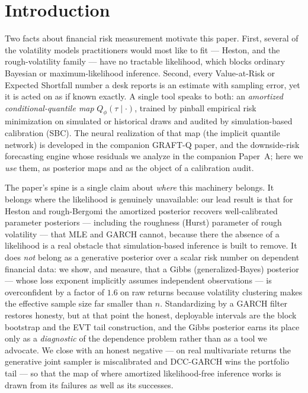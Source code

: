 \documentclass[11pt]{article}
\theoremstyle{remark}
\begin{document}
\section{Introduction}\label{sec:intro}
Two facts about financial risk measurement motivate this paper. First,
several of the volatility models practitioners would most like to fit ---
Heston, and the rough-volatility family --- have no tractable likelihood,
which blocks ordinary Bayesian or maximum-likelihood inference. Second,
every Value-at-Risk or Expected Shortfall number a desk reports is an
estimate with sampling error, yet it is acted on as if known exactly. A
single tool speaks to both: an \emph{amortized conditional-quantile map}
$Q_\phi(\tau\mid\cdot)$, trained by pinball empirical risk minimization
on simulated or historical draws and audited by simulation-based
calibration (SBC). The neural realization of that map (the implicit
quantile network) is developed in the companion GRAFT-Q paper, and the
downside-risk forecasting engine whose residuals we analyze in the
companion Paper~A; here we \emph{use} them, as posterior maps and as the
object of a calibration audit.

The paper's spine is a single claim about \emph{where} this machinery
belongs. It belongs where the likelihood is genuinely unavailable: our
lead result is that for Heston and rough-Bergomi the amortized posterior
recovers well-calibrated parameter posteriors --- including the roughness
(Hurst) parameter of rough volatility --- that MLE and GARCH cannot,
because there the absence of a likelihood is a real obstacle that
simulation-based inference is built to remove. It does \emph{not} belong
as a generative posterior over a scalar risk number on dependent
financial data: we show, and measure, that a Gibbs (generalized-Bayes)
posterior --- whose loss exponent implicitly assumes independent
observations --- is overconfident by a factor of $1.6$ on raw returns
because volatility clustering makes the effective sample size far smaller
than $n$. Standardizing by a GARCH filter restores honesty, but at that
point the honest, deployable intervals are the block bootstrap and the
EVT tail construction, and the Gibbs posterior earns its place only as a
\emph{diagnostic} of the dependence problem rather than as a tool we
advocate. We close with an honest negative --- on real multivariate
returns the generative joint sampler is miscalibrated and DCC-GARCH wins
the portfolio tail --- so that the map of where amortized likelihood-free
inference works is drawn from its failures as well as its successes.
\end{document}
